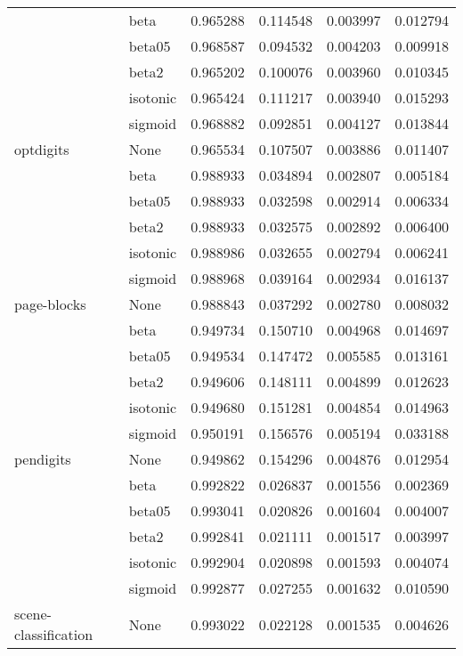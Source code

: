 \begin{tabular}{llrrrr}
        & beta &  0.965288 &  0.114548 &  0.003997 &  0.012794 \\
        & beta05 &  0.968587 &  0.094532 &  0.004203 &  0.009918 \\
        & beta2 &  0.965202 &  0.100076 &  0.003960 &  0.010345 \\
        & isotonic &  0.965424 &  0.111217 &  0.003940 &  0.015293 \\
        & sigmoid &  0.968882 &  0.092851 &  0.004127 &  0.013844 \\
optdigits & None &  0.965534 &  0.107507 &  0.003886 &  0.011407 \\
        & beta &  0.988933 &  0.034894 &  0.002807 &  0.005184 \\
        & beta05 &  0.988933 &  0.032598 &  0.002914 &  0.006334 \\
        & beta2 &  0.988933 &  0.032575 &  0.002892 &  0.006400 \\
        & isotonic &  0.988986 &  0.032655 &  0.002794 &  0.006241 \\
        & sigmoid &  0.988968 &  0.039164 &  0.002934 &  0.016137 \\
page-blocks & None &  0.988843 &  0.037292 &  0.002780 &  0.008032 \\
        & beta &  0.949734 &  0.150710 &  0.004968 &  0.014697 \\
        & beta05 &  0.949534 &  0.147472 &  0.005585 &  0.013161 \\
        & beta2 &  0.949606 &  0.148111 &  0.004899 &  0.012623 \\
        & isotonic &  0.949680 &  0.151281 &  0.004854 &  0.014963 \\
        & sigmoid &  0.950191 &  0.156576 &  0.005194 &  0.033188 \\
pendigits & None &  0.949862 &  0.154296 &  0.004876 &  0.012954 \\
        & beta &  0.992822 &  0.026837 &  0.001556 &  0.002369 \\
        & beta05 &  0.993041 &  0.020826 &  0.001604 &  0.004007 \\
        & beta2 &  0.992841 &  0.021111 &  0.001517 &  0.003997 \\
        & isotonic &  0.992904 &  0.020898 &  0.001593 &  0.004074 \\
        & sigmoid &  0.992877 &  0.027255 &  0.001632 &  0.010590 \\
scene-classification & None &  0.993022 &  0.022128 &  0.001535 &  0.004626 \\

\end{tabular}

